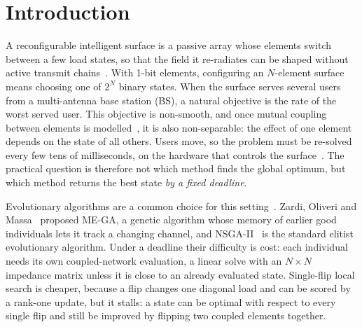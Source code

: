 \documentclass[runningheads]{llncs}
\begin{document}
\section{Introduction}
A reconfigurable intelligent surface is a passive array whose elements switch between a few load states, so that the field it re-radiates can be shaped without active transmit chains~\cite{li2026tutorial}. With 1-bit elements, configuring an $N$-element surface means choosing one of $2^N$ binary states. When the surface serves several users from a multi-antenna base station (BS), a natural objective is the rate of the worst served user. This objective is non-smooth, and once mutual coupling between elements is modelled~\cite{qian2021mutual,zheng2024mutual,nerini2024universal,nerini2026global}, it is also non-separable: the effect of one element depends on the state of all others. Users move, so the problem must be re-solved every few tens of milliseconds, on the hardware that controls the surface~\cite{urbinati2026ondevice}. The practical question is therefore not which method finds the global optimum, but which method returns the best state \emph{by a fixed deadline}.

Evolutionary algorithms are a common choice for this setting~\cite{stylianopoulos2022dlga,zardi2024memory}. Zardi, Oliveri and Massa~\cite{zardi2024memory} proposed ME-GA, a genetic algorithm whose memory of earlier good individuals lets it track a changing channel, and NSGA-II~\cite{deb2002fast} is the standard elitist evolutionary algorithm. Under a deadline their difficulty is cost: each individual needs its own coupled-network evaluation, a linear solve with an $N\times N$ impedance matrix unless it is close to an already evaluated state. Single-flip local search is cheaper, because a flip changes one diagonal load and can be scored by a rank-one update, but it stalls: a state can be optimal with respect to every single flip and still be improved by flipping two coupled elements together.
\end{document}
